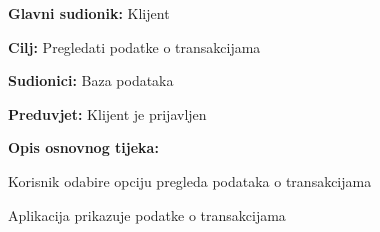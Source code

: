     			\noindent {}
    			\begin{packed_item}
    				
    				\item \textbf{Glavni sudionik: }Klijent
    				\item  \textbf{Cilj:} Pregledati podatke o transakcijama
    				\item  \textbf{Sudionici:} Baza podataka
    				\item  \textbf{Preduvjet:} Klijent je prijavljen
    				\item  \textbf{Opis osnovnog tijeka:}
    				
    				\item[] \begin{packed_enum}
    					
    					\item Korisnik odabire opciju pregleda podataka o transakcijama
    					\item Aplikacija prikazuje podatke o transakcijama 
    					
    					
    					
    				\end{packed_enum}
    				
    			\end{packed_item}
    		
